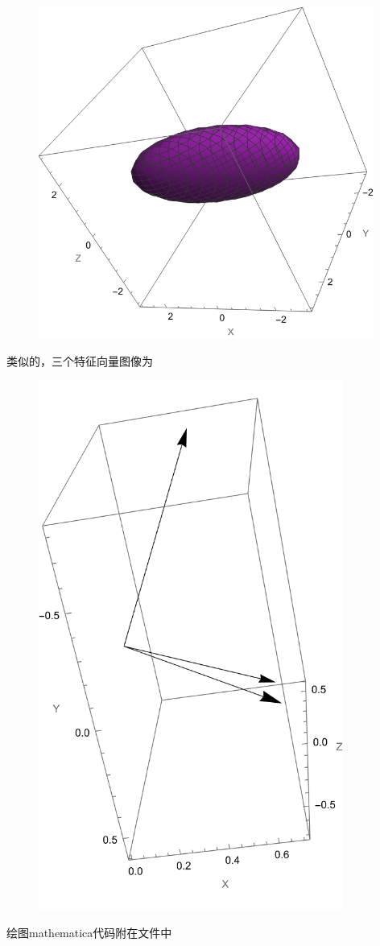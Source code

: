 \documentclass{article}
\begin{document}
\begin{figure}[H]
    \centering
    \includegraphics[width=11cm]{mathematica1.png}
    \caption{}
\end{figure}
类似的，三个特征向量图像为
\begin{figure}[H]
    \centering
    \includegraphics[width=10cm]{mathematica2.png}
    \caption{}
\end{figure}
绘图mathematica代码附在文件中
\end{document}
